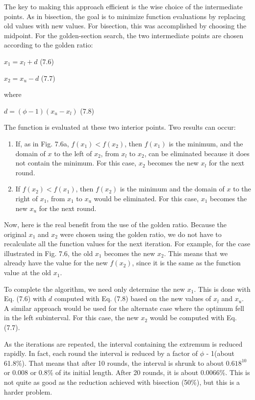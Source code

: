 \documentclass[../main.tex]{subfiles}
\begin{document}
The key to making this approach efficient is the wise choice of the intermediate points.
As in bisection, the goal is to minimize function evaluations by replacing old values with
new values. For bisection, this was accomplished by choosing the midpoint. For the
golden-section search, the two intermediate points are chosen according to the golden
ratio:
\smallskip

$x_1=x_l+d$ \hfill {(7.6)}

\smallskip
$x_2=x_u-d$ \hfill {(7.7)}

\noindent where
\smallskip

$d=(\phi-1)(x_u-x_l)$ \hfill {(7.8)}
\smallskip

\noindent The function is evaluated at these two interior points. Two results can occur:
\begin{enumerate}
	\item If, as in Fig. 7.6a, $f(x_1)<f(x_2)$, then $f(x_1)$ is the minimum, and the domain of $x$ to the
	left of $x_2$, from $x_l$ to $x_2$, can be eliminated because it does not contain the minimum. For
	this case, $x_2$ becomes the new $x_l$ for the next round.
	\item If $f(x_2)<f(x_1)$, then $f(x_2)$ is the minimum and the domain of $x$ to the right of $x_1$, from
	$x_1$ to $x_u$ would be eliminated. For this case, $x_1$ becomes the new $x_u$ for the next round.
\end{enumerate}

Now, here is the real benefit from the use of the golden ratio. Because the original $x_1$
and $x_2$ were chosen using the golden ratio, we do not have to recalculate all the function
values for the next iteration. For example, for the case illustrated in Fig. 7.6, the old $x_1$ becomes
the new $x_2$. This means that we already have the value for the new $f(x_2)$, since it is
the same as the function value at the old $x_1$.

To complete the algorithm, we need only determine the new $x_1$. This is done with
Eq. (7.6) with $d$ computed with Eq. (7.8) based on the new values of $x_l$ and $x_u$. A similar
approach would be used for the alternate case where the optimum fell in the left subinterval.
For this case, the new $x_2$ would be computed with Eq. (7.7).

As the iterations are repeated, the interval containing the extremum is reduced rapidly.
In fact, each round the interval is reduced by a factor of $\phi$ - 1(about 61.8\%). That means
that after 10 rounds, the interval is shrunk to about $0.618^{10}$ or 0.008 or 0.8\% of its initial
length. After 20 rounds, it is about 0.0066\%. This is not quite as good as the reduction
achieved with bisection (50\%), but this is a harder problem.
\end{document}
